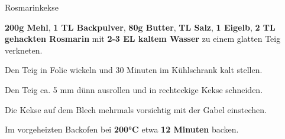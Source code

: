 \begin{recipe}[]{Rosmarinkekse} %

\step
\textbf{200g Mehl}, \textbf{1 TL Backpulver}, \textbf{80g Butter}, \textbf{ TL Salz}, \textbf{1 Eigelb}, \textbf{2 TL gehackten Rosmarin} mit \textbf{2-3 EL kaltem Wasser} zu einem glatten Teig verkneten. 

\step
Den Teig in Folie wickeln und 30 Minuten im Kühlschrank kalt stellen.

\step
Den Teig ca. 5 mm dünn ausrollen und in rechteckige Kekse schneiden.

\step
Die Kekse auf dem Blech mehrmals vorsichtig mit der Gabel einstechen.

\step
Im vorgeheizten Backofen bei \textbf{200°C} etwa \textbf{12 Minuten} backen.


\end{recipe}